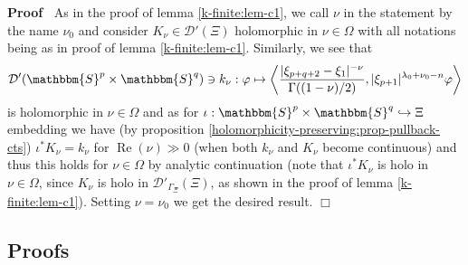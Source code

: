 \documentclass{article}
\newcommand{\nocomma}{}
\newcommand{\tmop}[1]{\ensuremath{\operatorname{#1}}}
\newenvironment{proof}{\noindent\textbf{Proof\ }}{\hspace*{\fill}$\Box$\medskip}
\begin{document}
\begin{proof}
  As in the proof of lemma \ref{k-finite:lem-c1}, we call $\nu$ in the
  statement by the name $\nu_0$ and consider $K_{\nu} \in \mathcal{D}' (\Xi)$
  holomorphic in $\nu \in \Omega$ with all notations being as in proof of
  lemma \ref{k-finite:lem-c1}. Similarly, we see that
  \[ \mathcal{D}' (\mathbbm{S}^p \times \mathbbm{S}^q) \ni k_{\nu} : \varphi
     \mapsto \left\langle \frac{| \xi_{p + q + 2} - \xi_1 |^{- \nu}}{\Gamma
     ((1 - \nu) / 2)} \nocomma, | \xi_{p + 1} |^{\lambda_0 + \nu_0 - n}
     \varphi \nocomma \right\rangle \]
  is holomorphic in $\nu \in \Omega$ and as for $\iota : \mathbbm{S}^p \times
  \mathbbm{S}^q \hookrightarrow \Xi$ embedding we have (by proposition
  \ref{holomorphicity-preserving:prop-pullback-cts}) $\iota^{\ast} K_{\nu} =
  k_{\nu}$ for $\tmop{Re} (\nu) \gg 0$ (when both $k_{\nu}$ and $K_{\nu}$
  become continuous) and thus this holds for $\nu \in \Omega$ by analytic
  continuation (note that $\iota^{\ast} K_{\nu}$ is holo in $\nu \in \Omega$,
  since $K_{\nu}$ is holo in $\mathcal{D}'_{\Gamma_{\Xi}} (\Xi)$, as shown in
  the proof of lemma \ref{k-finite:lem-c1}). Setting $\nu = \nu_0$ we get the
  desired result.
\end{proof}

\subsection{Proofs}
\end{document}
